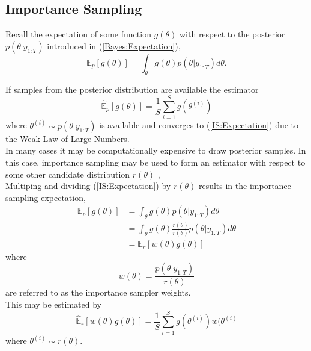 \documentclass[
12pt, %
onehalfspacing, %
nohyperref, %
headsepline, %
chapterinoneline, %
]{MastersDoctoralThesis} %
\begin{document}
\subsection{Importance Sampling}
\label{subsec:IS}

Recall the expectation of some function $g(\theta)$ with respect to the posterior $p(\theta | y_{1:T})$ introduced in (\ref{Bayes:Expectation}),
\begin{equation}
\label{IS:Expectation}
\mathbb{E}_{p} [g(\theta)] = \int_{\theta} g(\theta) p(\theta | y_{1:T}) d\theta. 
\end{equation}

If samples from the posterior distribution are available the estimator \begin{equation}
\label{IS:Estimator}
\hat{\mathbb{E}}_p[g(\theta)] = \frac{1}{S} \sum_{i=1}^S g(\theta^{(i)})
\end{equation}
where $\theta^{(i)} \sim p(\theta | y_{1:T})$ is available and converges to (\ref{IS:Expectation}) due to the Weak Law of Large Numbers.
\\

In many cases it may be computationally expensive to draw posterior samples. In this case, importance sampling may be used to form an estimator with respect to some other candidate distribution $r(\theta)$ \citep{Gelman2014},
\\

Multiping and dividing (\ref{IS:Expectation}) by $r(\theta)$ results in the importance sampling expectation,
\begin{align}
\mathbb{E}_{p} [g(\theta)] &= \int_{\theta} g(\theta) p(\theta | y_{1:T}) d\theta \nonumber \\
&= \int_{\theta} g(\theta) \frac{r(\theta)}{r(\theta)} p(\theta | y_{1:T}) d\theta \nonumber \\
&= \mathbb{E}_{r} \left[ w(\theta)g(\theta) \right] \label{IS:Expectation2}
\end{align}
where 
\begin{equation}
\label{IS:weights}
w(\theta) = \frac{p(\theta | y_{1:T})}{r(\theta)}
\end{equation}
are referred to as the importance sampler weights.
\\

This may be estimated by 
\begin{equation}
\label{IS:Estimator2}
\hat{\mathbb{E}}_r[w(\theta) g(\theta)] = \frac{1}{S} \sum_{i=1}^S g(\theta^{(i)}) w(\theta^{(i)}
\end{equation}
where $\theta^{(i)} \sim r(\theta)$.
\\
\end{document}
